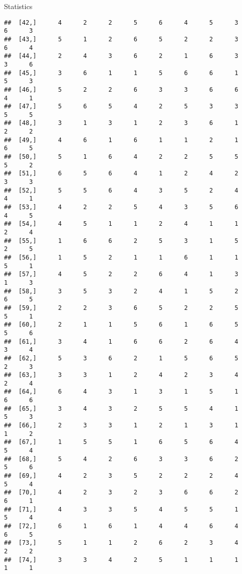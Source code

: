 \documentclass[
  ignorenonframetext,
]{beamer}
\begin{document}
\begin{frame}[fragile]{Statistics}
\begin{verbatim}
##  [42,]      4      2      2      5      6      4      5      3      6      3
##  [43,]      5      1      2      6      5      2      2      3      6      4
##  [44,]      2      4      3      6      2      1      6      3      3      6
##  [45,]      3      6      1      1      5      6      6      1      5      3
##  [46,]      5      2      2      6      3      3      6      6      4      1
##  [47,]      5      6      5      4      2      5      3      3      5      5
##  [48,]      3      1      3      1      2      3      6      1      2      2
##  [49,]      4      6      1      6      1      1      2      1      6      5
##  [50,]      5      1      6      4      2      2      5      5      5      2
##  [51,]      6      5      6      4      1      2      4      2      3      3
##  [52,]      5      5      6      4      3      5      2      4      4      1
##  [53,]      4      2      2      5      4      3      5      6      4      5
##  [54,]      4      5      1      1      2      4      1      1      2      4
##  [55,]      1      6      6      2      5      3      1      5      2      5
##  [56,]      1      5      2      1      1      6      1      1      5      1
##  [57,]      4      5      2      2      6      4      1      3      1      3
##  [58,]      3      5      3      2      4      1      5      2      6      5
##  [59,]      2      2      3      6      5      2      2      5      5      1
##  [60,]      2      1      1      5      6      1      6      5      5      6
##  [61,]      3      4      1      6      6      2      6      4      3      4
##  [62,]      5      3      6      2      1      5      6      5      2      3
##  [63,]      3      3      1      2      4      2      3      4      2      4
##  [64,]      6      4      3      1      3      1      5      1      6      6
##  [65,]      3      4      3      2      5      5      4      1      5      3
##  [66,]      2      3      3      1      2      1      3      1      1      2
##  [67,]      1      5      5      1      6      5      6      4      5      4
##  [68,]      5      4      2      6      3      3      6      2      5      6
##  [69,]      4      2      3      5      2      2      2      4      5      4
##  [70,]      4      2      3      2      3      6      6      2      6      1
##  [71,]      4      3      3      5      4      5      5      1      5      4
##  [72,]      6      1      6      1      4      4      6      4      6      5
##  [73,]      5      1      1      2      6      2      3      4      2      2
##  [74,]      3      3      4      2      5      1      1      1      1      1

\end{verbatim}
\end{frame}
\end{document}
